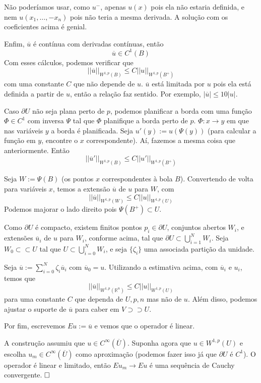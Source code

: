 \documentclass[a4paper, 11pt]{book}
\newcommand{\qed}{$\hfill\square$}
\newcommand{\Rn}{{\mathbb{R}^n}}
\newcommand{\pu}{\partial U}
\begin{document}
Não poderíamos usar, como $ u^- $, apenas $ u(x) $ pois ela não estaria definida, e nem $ u(x_1,\ldots, -x_n) $ pois não teria a mesma derivada. A solução com os coeficientes acima é genial.


Enfim, $ \overline{u} $ é contínua com derivadas contínuas, então \[ \overline{u} \in C^1(B) \]
Com esses cálculos, podemos verificar que \[ ||\overline{u}||_{W^{1,p}(B)} \leq C ||u||_{W^{1,p}(B^+)} \] com uma constante \( C \) que não depende de \( u \). $\overline{u} $ está limitada por $u$ pois ela está definida a partir de $u$, então a relação faz sentido. Por exemplo, $|\overline{u}| \leq 10  |u| $.

Caso \( \pu \) não seja plana perto de \( p \), podemos planificar a borda com uma função \( \Phi \in C^1 \) com inversa \( \Psi \) tal que \( \Phi \) planifique a borda perto de \( p \).
\( \Phi: x \rightarrow y \) em que nas variáveis \( y \) a borda é planificada. Seja \( u'(y) := u(\Psi(y)) \) (para calcular a função em \( y \), encontre o \( x \) correspondente). Aí, fazemos a mesma coisa que anteriormente. Então \[ ||\overline{u}'||_{W^{1,p}(B)} \leq C ||u'||_{W^{1,p}(B^+)} \]

Seja \( W:= \Psi(B) \) (os pontos \( x \) correspondentes à bola \( B \)). Convertendo de volta para variáveis \( x \), temos a extensão \( \overline{u} \) de \( u \) para \( W \), com \[ ||\overline{u}||_{W^{1,p}(W)} \leq C ||u||_{W^{1,p}(U)} \] Podemos majorar o lado direito pois \( \Psi(B^+) \subset  U  \).

Como \( \pu \) é compacto, existem finitos pontos \( p_i \in \pu \), conjuntos abertos \( W_i \), e extensões \( \overline{u}_i \) de \( u \) para \( W_i \), conforme acima, tal que \( \pu \subset \bigcup_{i=1}^N W_i \). Seja \( W_0 \subset\subset U \) tal que \( U \subset \bigcup_{i=0}^N W_i \), e seja \( \{ \zeta_i \} \) uma associada partição da unidade.

Seja \( \overline{u} := \sum_{i=0}^{N} \zeta_i \overline{u}_i \) com \( \overline{u}_0 = u \).  Utilizando a estimativa acima, com \( \overline{u}_i \) e \( u_i \), temos que \[ ||\overline{u}||_{W^{1,p}(\Rn)} \leq C ||u||_{W^{1,p}(U)} \]
para uma constante \( C \) que dependa de \( U,p,n \) mas não de \( u \). Além disso, podemos ajustar o suporte de \( \overline{u} \) para caber em \( V \supset\supset U \).

Por fim, escrevemos \( Eu:=\overline{u} \) e vemos que o operador é linear. 

A construção assumiu que \( u \in C^\infty(\overline{U}) \). Suponha agora que \( u \in W^{1,p}(U) \) e escolha \( u_m \in C^\infty(\overline{U}) \) como aproximação (podemos fazer isso já que \( \pu  \) é \( C^1 \)). O operador é linear e limitado, então \( Eu_m \rightarrow Eu \) é uma sequência de Cauchy convergente. \qed
\end{document}
